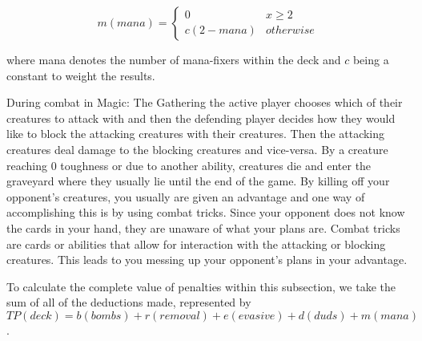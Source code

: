 \documentclass[12pt, letterpaper]{article}
\begin{document}
$$ m(mana) = \begin{cases}
    0 & x \ge 2 \\
    c(2 - mana) & otherwise
\end{cases}
$$

where mana denotes the number of mana-fixers within the deck
and $ c $ being a constant to weight the results.

During combat in Magic: The Gathering
the active player chooses which of their creatures to attack with
and then the defending player decides how they would like to block the attacking creatures
with their creatures.
Then the attacking creatures deal damage to the blocking creatures and vice-versa.
By a creature reaching 0 toughness or due to another ability,
creatures die and enter the graveyard where they usually lie until the end of the game.
By killing off your opponent’s creatures,
you usually are given an advantage and one way of accomplishing this is by using combat tricks.
Since your opponent does not know the cards in your hand,
they are unaware of what your plans are.
Combat tricks are cards or abilities that allow for interaction
with the attacking or blocking creatures.
This leads to you messing up your opponent’s plans in your advantage.

To calculate the complete value of penalties within this subsection,
we take the sum of all of the deductions made,
represented by $ TP(deck) = b(bombs) + r(removal) + e(evasive) + d(duds) + m(mana) $.
\end{document}
